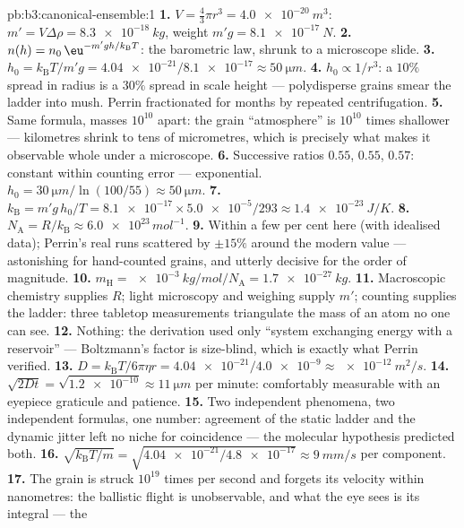 \begin{solution}{pb:b3:canonical-ensemble:1}
\textbf{1.} $V = \tfrac43\pi r^3 = \qty{4.0e-20}{m^3}$: $m' = V
\Delta\rho = \qty{8.3e-18}{kg}$, weight $m'g = \qty{8.1e-17}{N}$.
\textbf{2.} $n(h) = n_0\,\eu^{-m'gh/k_{\text{B}}T}$: the
barometric law, shrunk to a microscope slide.
\textbf{3.} $h_0 = k_{\text{B}}T/m'g = \num{4.04e-21}/\num{8.1e-17}
\approx \qty{50}{\micro m}$.
\textbf{4.} $h_0 \propto 1/r^3$: a $10\%$ spread in radius is a
$30\%$ spread in scale height --- polydisperse grains smear the
ladder into mush. Perrin fractionated for months by repeated
centrifugation.
\textbf{5.} Same formula, masses $10^{10}$ apart: the grain
``atmosphere'' is $10^{10}$ times shallower --- kilometres shrink
to tens of micrometres, which is precisely what makes it
observable whole under a microscope.
\textbf{6.} Successive ratios $0.55$, $0.55$, $0.57$: constant
within counting error --- exponential. $h_0 =
\qty{30}{\micro m}/\ln(100/55) \approx \qty{50}{\micro m}$.
\textbf{7.} $k_{\text{B}} = m'g\,h_0/T = \num{8.1e-17} \times
\num{5.0e-5}/293 \approx \qty{1.4e-23}{J/K}$.
\textbf{8.} $N_{\text{A}} = R/k_{\text{B}} \approx
\num{6.0e23}\,\unit{mol^{-1}}$.
\textbf{9.} Within a few per cent here (with idealised data);
Perrin's real runs scattered by $\pm15\%$ around the modern value
--- astonishing for hand-counted grains, and utterly decisive for
the order of magnitude.
\textbf{10.} $m_{\text{H}} = \qty{e-3}{kg/mol}/N_{\text{A}} =
\qty{1.7e-27}{kg}$.
\textbf{11.} Macroscopic chemistry supplies $R$; light microscopy
and weighing supply $m'$; counting supplies the ladder: three
tabletop measurements triangulate the mass of an atom no one can
see.
\textbf{12.} Nothing: the derivation used only ``system
exchanging energy with a reservoir'' --- Boltzmann's factor is
size-blind, which is exactly what Perrin verified.
\textbf{13.} $D = k_{\text{B}}T/6\pi\eta r =
\num{4.04e-21}/\num{4.0e-9} \approx \qty{e-12}{m^2/s}$.
\textbf{14.} $\sqrt{2Dt} = \sqrt{\num{1.2e-10}} \approx
\qty{11}{\micro m}$ per minute: comfortably measurable with an
eyepiece graticule and patience.
\textbf{15.} Two independent phenomena, two independent formulas,
one number: agreement of the static ladder and the dynamic jitter
left no niche for coincidence --- the molecular hypothesis
predicted both.
\textbf{16.} $\sqrt{k_{\text{B}}T/m} = \sqrt{\num{4.04e-21}/
\num{4.8e-17}} \approx \qty{9}{mm/s}$ per component.
\textbf{17.} The grain is struck $10^{19}$ times per second and
forgets its velocity within nanometres: the ballistic flight is
unobservable, and what the eye sees is its integral --- the

\end{solution}
